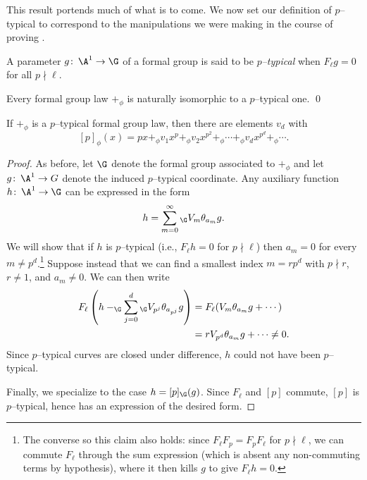 This result portends much of what is to come.  We now set our definition of $p$--typical to correspond to the manipulations we were making in the course of proving .

\begin{definition}\label{pTypicalityInGeneral}
A parameter $g\co \A^1 \to \G$ of a formal group is said to be \textit{$p$--typical} when $F_\ell g = 0$ for all $p \nmid \ell$.
\end{definition}

\begin{corollary}\label{EveryFGLIsPTypical}
Every formal group law $+_\phi$ is naturally isomorphic to a $p$--typical one. \qed
\end{corollary}

\begin{lemma}\label{pTypLawsHaveNicePSeries}
If $+_\phi$ is a $p$--typical formal group law, then there are elements $v_d$ with \[[p]_\phi(x) = px +_\phi v_1 x^p +_\phi v_2 x^{p^2} +_\phi \cdots +_\phi v_d x^{p^d} +_\phi \cdots.\]
\end{lemma}
\begin{proof}
As before, let $\G$ denote the formal group associated to $+_\phi$ and let $g\co \A^1 \to G$ denote the induced $p$--typical coordinate.  Any auxiliary function $h\co \A^1 \to \G$ can be expressed in the form \[h = \sum_{m = 0}^\infty {}_{\G} V_m \theta_{a_m} g.\]  We will show that if $h$ is $p$--typical (i.e., $F_\ell h = 0$ for $p \nmid \ell$) then $a_m = 0$ for every $m \ne p^d$.\footnote{The converse so this claim also holds: since $F_\ell F_p = F_p F_\ell$ for $p \nmid \ell$, we can commute $F_\ell$ through the sum expression (which is absent any non-commuting terms by hypothesis), where it then kills $g$ to give $F_\ell h = 0$.}  Suppose instead that we can find a smallest index $m = rp^d$ with $p \nmid r$, $r \ne 1$, and $a_m \ne 0$.  We can then write
\begin{align*}
F_\ell \left( h -_{\G} \sum_{j=0}^{d} {}_{\G} V_{p^j} \theta_{a_{p^j}} g \right) & = F_\ell(V_m \theta_{a_m} g + \cdots) \\
& = r V_{p^d} \theta_{a_m} g + \cdots \ne 0.
\end{align*}
Since $p$--typical curves are closed under difference, $h$ could not have been $p$--typical.

Finally, we specialize to the case $h = [p]_{\G}(g)$.  Since $F_\ell$ and $[p]$ commute, $[p]$ is $p$--typical, hence has an expression of the desired form.
\end{proof}

